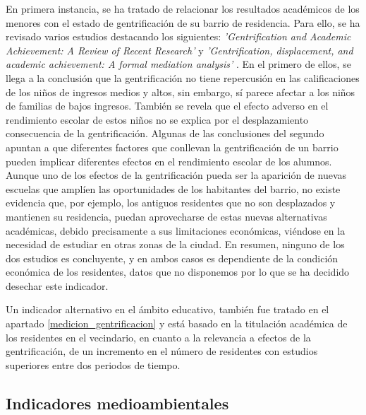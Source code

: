\documentclass[12pt,a4paper,twoside]{book}
\begin{document}
En primera instancia, se ha tratado de relacionar los resultados académicos de los menores con el estado de gentrificación de su barrio de residencia. Para ello, se ha revisado varios estudios destacando los siguientes: \textit{'Gentrification and Academic Achievement: A Review of Recent Research'} \cite{pearman_gentrification_2019} y \textit{'Gentrification, displacement, and academic achievement: A formal mediation analysis'} \cite{pearman_gentrification_2023}.
En el primero de ellos, se llega a la conclusión que la gentrificación no tiene repercusión en las calificaciones de los niños de ingresos medios y altos, sin embargo, sí parece afectar a los niños de familias de bajos ingresos. También se revela que el efecto adverso en el rendimiento escolar de estos niños no se explica por el desplazamiento consecuencia de la gentrificación.
Algunas de las conclusiones del segundo apuntan a que diferentes factores que conllevan la gentrificación de un barrio pueden implicar diferentes efectos en el rendimiento escolar de los alumnos. Aunque uno de los efectos de la gentrificación pueda ser la aparición de nuevas escuelas que amplíen las oportunidades de los habitantes del barrio, no existe evidencia que, por ejemplo, los antiguos residentes que no son desplazados y mantienen su residencia, puedan aprovecharse de estas nuevas alternativas académicas, debido precisamente a sus limitaciones económicas, viéndose en la necesidad de estudiar en otras zonas de la ciudad.
En resumen, ninguno de los dos estudios es concluyente, y en ambos casos es dependiente de la condición económica de los residentes, datos que no disponemos por lo que se ha decidido desechar este indicador.

Un indicador alternativo en el ámbito educativo, también fue tratado en el apartado \ref{medicion_gentrificacion} y está basado en la titulación académica de los residentes en el vecindario, en cuanto a la relevancia a efectos de la gentrificación, de un incremento en el número de residentes con estudios superiores entre dos periodos de tiempo.


\subsection{Indicadores medioambientales}
\end{document}
